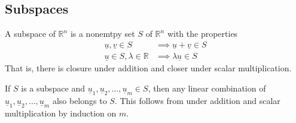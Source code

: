 \documentclass[a4paper]{article}
\theoremstyle{plain}
\theoremstyle{definition}
\newtheorem{defn}{Definition}[section]
\theoremstyle{remark}
\begin{document}
\subsection{Subspaces}
\begin{tcolorbox}[colback=black!3!white,colframe=black!60!white,title=\begin{defn}Subspaces \label{Subspaces}\end{defn}]
A subspace of $\mathbb{R}^{n}$ is a nonemtpy set $S$ of $\mathbb{R}^{n}$ with the properties
\begin{align}
	\underline{u}, \underline{v} \in S &\implies \underline{u} + \underline{v} \in S \\
\underline{u} \in S, \lambda \in \mathbb{R} &\implies \lambda \underline{u} \in S
\end{align}
That is, there is closure under addition and closer under scalar multiplication.
\end{tcolorbox}
If $S$ is a subspace and $\underline{u}_1, \underline{u}_2,\ldots,\underline{u}_m \in S$, then any linear combination of $\underline{u}_1, \underline{u}_2, \ldots,\underline{u}_m$ also belongs to $S$. This follows from under addition and scalar multiplication by induction on $m$.
\end{document}
